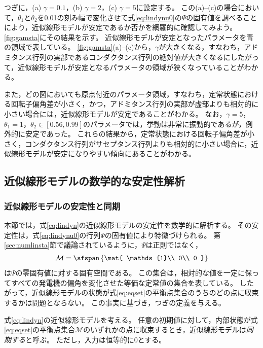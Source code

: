 \documentclass[tombow,dvipdfmx]{corona-a5}
\begin{document}
\begin{例}[近似線形モデルの数値的な安定性解析]
つぎに，(a) $\gamma=0.1$，(b) $\gamma=2$，(c) $\gamma=5$に設定する。
この(a)--(c)の場合において，$\theta_1$と$\theta_2$を0.01の刻み幅で変化させて式\ref{eq:lindynu0}の$\Psi$の固有値を調べることにより，近似線形モデルが安定であるか否かを網羅的に確認してみよう。
\ref{fig:gamsta}にその結果を示す。
近似線形モデルが安定となったパラメータを青の領域で表している。
\ref{fig:gamsta}(a)--(c)から，$\gamma$が大きくなる，すなわち，アドミタンス行列の実部であるコンダクタンス行列の絶対値が大きくなるにしたがって，近似線形モデルが安定となるパラメータの領域が狭くなっていることがわかる。

また，どの図においても原点付近のパラメータ領域，すなわち，定常状態における回転子偏角差が小さく，かつ，アドミタンス行列の実部が虚部よりも相対的に小さい場合には，近似線形モデルが安定であることがわかる。
なお，$\gamma=5$，$\theta_1=1$，$\theta_2 \in [0.56,0.99]$のパラメータでは，挙動は非常に振動的であるが，例外的に安定であった。
これらの結果から，定常状態における回転子偏角差が小さく，コンダクタンス行列がサセプタンス行列よりも相対的に小さい場合に，近似線形モデルが安定になりやすい傾向にあることがわかる。
\end{例}




\subsection{近似線形モデルの数学的な安定性解析\advanced}

\subsubsection{近似線形モデルの安定性と同期}

本節では，式\ref{eq:lindyn}の近似線形モデルの安定性を数学的に解析する。
その安定性は，式\ref{eq:lindynu0}の行列$\Psi$の固有値により特徴づけられる。
第\ref{sec:numlinsta}節で議論されているように，$\Psi$は正則ではなく，
\begin{align}\label{eq:eqset}
\mathcal{M} =
 \sfspan\left\{
 \mat{
 \mathds{1}\\
 0\\
 0
 }
 \right\}
\end{align}
は$\Psi$の零固有値に対する固有空間である。
この集合は，相対的な値を一定に保ってすべての発電機の偏角を変化させた等価な定常値の集合を表している。
したがって，近似線形モデルの状態が式\ref{eq:eqset}の平衡点集合のうちのどの点に収束するかは問題とならない。
この事実に基づき，つぎの定義を与える。

\begin{定義}[近似線形モデルの同期]
\label{def:stalin}
式\ref{eq:lindyn}の近似線形モデルを考える。
任意の初期値に対して，内部状態が式\ref{eq:eqset}の平衡点集合$\mathcal{M}$のいずれかの点に収束するとき，近似線形モデルは\emph{同期する}と呼ぶ。
ただし，入力は恒等的に0とする。
\end{定義}
\end{document}

